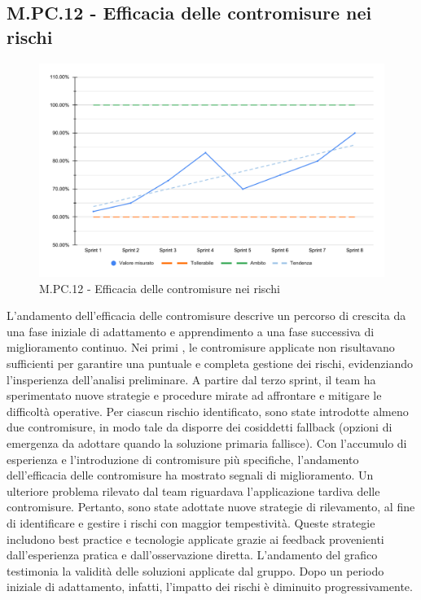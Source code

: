 \subsection{M.PC.12 - Efficacia delle contromisure nei rischi}
\begin{figure}[H]
    \centering
    \includegraphics[width=\textwidth]{assets/efficienza_contromisure.pdf}
    \caption{M.PC.12 - Efficacia delle contromisure nei rischi}
\end{figure}

\par L'andamento dell'efficacia delle contromisure descrive un percorso di crescita da una fase iniziale di adattamento e apprendimento a una fase successiva di miglioramento continuo. Nei primi , le contromisure applicate non risultavano sufficienti per garantire una puntuale e completa gestione dei rischi, evidenziando l’insperienza dell'analisi preliminare. A partire dal terzo sprint, il team ha sperimentato nuove strategie e procedure mirate ad affrontare e mitigare le difficoltà operative. Per ciascun rischio identificato, sono state introdotte almeno due contromisure, in modo tale da disporre dei cosiddetti fallback (opzioni di emergenza da adottare quando la soluzione primaria fallisce). Con l'accumulo di esperienza e l’introduzione di contromisure più specifiche, l'andamento dell'efficacia delle contromisure ha mostrato segnali di miglioramento. Un ulteriore problema rilevato dal team riguardava l’applicazione tardiva delle contromisure. Pertanto, sono state adottate nuove strategie di rilevamento, al fine di identificare e gestire i rischi con maggior tempestività. Queste strategie includono best practice e tecnologie applicate grazie ai feedback provenienti dall'esperienza pratica e dall’osservazione diretta. L’andamento del grafico testimonia la validità delle soluzioni applicate dal gruppo. Dopo un periodo iniziale di adattamento, infatti, l'impatto dei rischi è diminuito progressivamente. 
